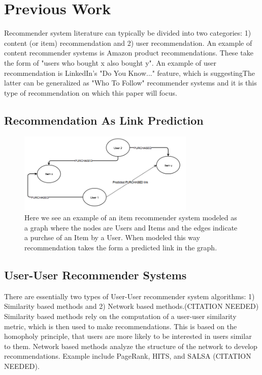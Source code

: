 
\chapter{Previous Work}
Recommender system literature can typically be divided into two categories: 1) content (or item) recommendation and 2) user recommendation. An example of content recommender systems is Amazon product recommendations. These take the form of "users who bought x also bought y".  An example of user recommendation is LinkedIn's "Do You Know..." feature, which is suggestingThe latter can be generalized as "Who To Follow" recommender systems and it is this type of recommendation on which this paper will focus.

\section{Recommendation As Link Prediction}
\begin{figure}[H]
  \centering
  \includegraphics[width=0.75\textwidth]{images/item_link_prediction.png}
  \caption[Item Link Prediction]{Here we see an example of an item recommender system modeled as a graph where the nodes are Users and Items and the edges indicate a purchse of an Item by a User. When modeled this way recommendation takes the form a predicted link in the graph.}
  \label{fig:figures:1}
\end{figure}


\section{User-User Recommender Systems}
There are essentially two types of User-User recommender system algorithms: 1) Similarity based methods and 2) Network based methods.(CITATION NEEDED) Similarity based methods rely on the computation of a user-user similarity metric, which is then used to make recommendations. This is based on the homopholy principle, that users are more likely to be interested in users similar to them. Network based methods analyze the structure of the network to develop recommendations. Example include PageRank, HITS, and SALSA (CITATION NEEDED).

